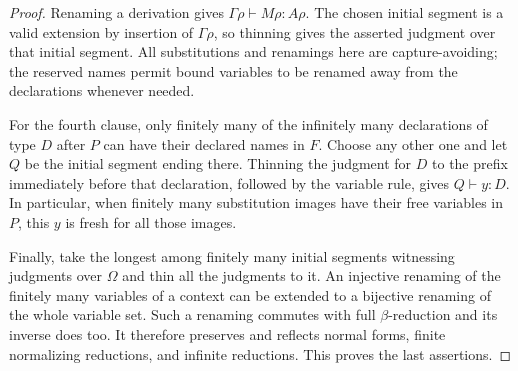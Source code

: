\begin{proof}
Renaming a derivation gives
$\Gamma\rho\vdash M\rho:A\rho$.  The chosen initial segment is a
valid extension by insertion of $\Gamma\rho$, so thinning gives the
asserted judgment over that initial segment.  All substitutions and
renamings here are capture-avoiding; the reserved names permit bound
variables to be renamed away from the declarations whenever needed.

For the fourth clause, only finitely many of the infinitely many
declarations of type $D$ after $P$ can have their declared names in
$F$.  Choose any other one and let $Q$ be the initial segment ending
there.  Thinning the judgment for $D$ to the prefix immediately before
that declaration, followed by the variable rule, gives $Q\vdash y:D$.
In particular, when finitely many substitution images have their free
variables in $P$, this $y$ is fresh for all those images.

Finally, take the longest among finitely many initial segments
witnessing judgments over $\Omega$ and thin all the judgments to it.
An injective renaming of the finitely many variables of a context can
be extended to a bijective renaming of the whole variable set.  Such
a renaming commutes with full $\beta$-reduction and its inverse does
too.  It therefore preserves and reflects normal forms, finite
normalizing reductions, and infinite reductions.  This proves the
last assertions.
\end{proof}
